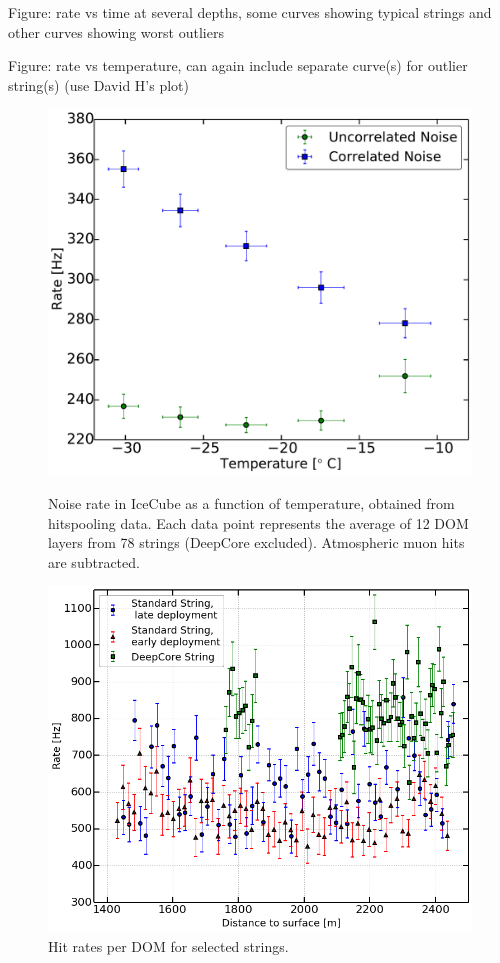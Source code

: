 Figure: rate vs time at several depths, some curves showing typical strings and other curves showing worst outliers


Figure: rate vs temperature, can again include separate curve(s) for outlier string(s) (use David H’s plot)

\begin{figure}
 \begin{minipage}[t]{0.45\linewidth}
 \centering
  \includegraphics[width=\textwidth]{graphics/dom/performance/darknoise/HitRatevsTemp_inice_nomuons_nofit_bigfont.pdf}
 \caption{Noise rate in IceCube as a function of temperature, obtained from hitspooling data. Each data point represents the average of \num{12} DOM layers from \num{78} strings (DeepCore excluded). Atmospheric muon hits are subtracted.}
 \label{fig:HitRatevsTemp}
 \end{minipage}
\hfill
 \begin{minipage}[t]{0.45\linewidth}
 \centering
  \includegraphics[width=\textwidth]{graphics/dom/performance/darknoise/StringHitRate_36_85.png}
 \caption{Hit rates per DOM for selected strings.}
 \label{fig:HitRatevsDepth_early_leate_dc_string}
 \end{minipage}
\end{figure}
